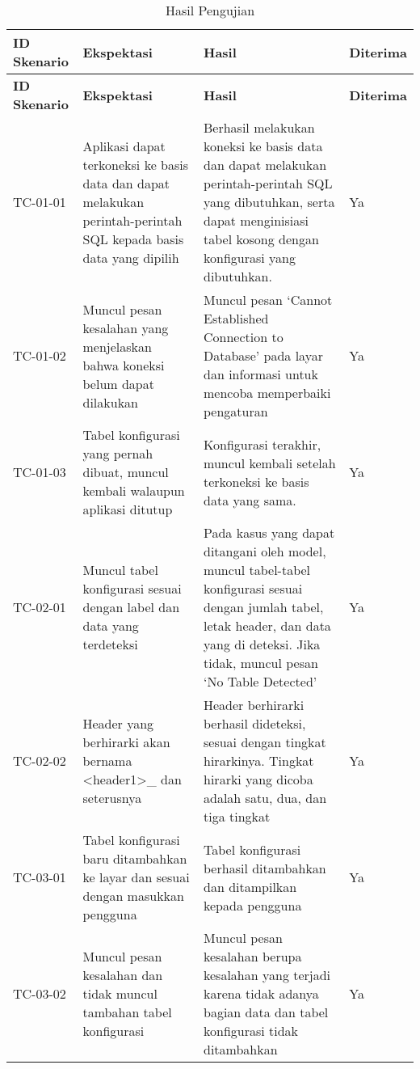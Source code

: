 \begin{small}
\begin{longtable}{ | p{2cm} | p{4cm} | p{4cm} | p{2cm} | }
    \caption{Hasil Pengujian}
    \label{HasilUji}\\ \hline
    \centering\bfseries{ID Skenario} & \centering\bfseries{Ekspektasi} & \centering\bfseries{Hasil} & \centering\bfseries{Diterima} \tabularnewline \hline
    \endfirsthead
    \hline
    \centering\bfseries{ID Skenario} & \centering\bfseries{Ekspektasi} & \centering\bfseries{Hasil} & \centering\bfseries{Diterima} \tabularnewline \hline
    \endhead
    TC-01-01 & Aplikasi dapat terkoneksi ke basis data dan dapat melakukan perintah-perintah SQL kepada basis data yang dipilih & Berhasil melakukan koneksi ke basis data dan dapat melakukan perintah-perintah SQL yang dibutuhkan, serta dapat menginisiasi tabel kosong dengan konfigurasi yang dibutuhkan. & Ya
	\\ \hline TC-01-02 & Muncul pesan kesalahan yang menjelaskan bahwa koneksi belum dapat dilakukan & Muncul pesan ‘Cannot Established Connection to Database’ pada layar dan informasi untuk mencoba memperbaiki pengaturan & Ya
	\\ \hline TC-01-03 & Tabel konfigurasi yang pernah dibuat, muncul kembali walaupun aplikasi ditutup & Konfigurasi terakhir, muncul kembali setelah terkoneksi ke basis data yang sama. & Ya

	\\ \hline TC-02-01 & Muncul tabel konfigurasi sesuai dengan label dan data yang terdeteksi & Pada kasus yang dapat ditangani oleh model, muncul tabel-tabel konfigurasi sesuai dengan jumlah tabel, letak header, dan data yang di deteksi. Jika tidak, muncul pesan ‘No Table Detected’ & Ya
	\\ \hline TC-02-02 & Header yang berhirarki akan bernama <header1>\_<header2> dan seterusnya & Header berhirarki berhasil dideteksi, sesuai dengan tingkat hirarkinya. Tingkat hirarki yang dicoba adalah satu, dua, dan tiga tingkat & Ya

	\\ \hline TC-03-01 & Tabel konfigurasi baru ditambahkan ke layar dan sesuai dengan masukkan pengguna & Tabel konfigurasi berhasil ditambahkan dan ditampilkan kepada pengguna & Ya
	\\ \hline TC-03-02 & Muncul pesan kesalahan dan tidak muncul tambahan tabel konfigurasi & Muncul pesan kesalahan berupa kesalahan yang terjadi karena tidak adanya bagian data dan tabel konfigurasi tidak ditambahkan & Ya


\end{longtable}
\end{small}

